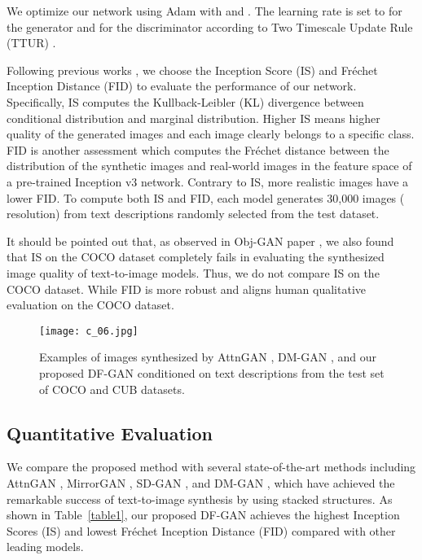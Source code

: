 \documentclass[10pt,twocolumn,letterpaper]{article}
\begin{document}
 We optimize our network using Adam \cite{kingma2014adam} with  and . The learning rate is set to  for the generator and  for the discriminator according to Two Timescale Update Rule (TTUR) \cite{heusel2017gans}. 

 Following previous works \cite{xu2018attngan, zhu2019dm}, we choose the Inception Score (IS) \cite{salimans2016improved} and Fr\'echet Inception Distance (FID) \cite{heusel2017gans} to evaluate the performance of our network. 
Specifically, IS computes the Kullback-Leibler (KL) divergence between conditional distribution and marginal distribution. 
Higher IS means higher quality of the generated images and each image clearly belongs to a specific class. 
FID \cite{heusel2017gans} is another assessment which computes the Fr\'echet distance between the distribution of the synthetic images and real-world images in the feature space of a pre-trained Inception v3 network. 
Contrary to IS, more realistic images have a lower FID.
To compute both IS and FID, each model generates 30,000 images ( resolution) from text descriptions randomly selected from the test dataset. 

It should be pointed out that, as observed in Obj-GAN paper \cite{li2019object,ramesh2021zero}, we also found that IS on the COCO dataset completely fails in evaluating the synthesized image quality of text-to-image models. Thus, we do not compare IS on the COCO dataset. While  FID is more robust and aligns human qualitative evaluation on the COCO dataset. 

\begin{figure*}[t] \small
  \centering
  \texttt{[image: c\_06.jpg]}
  \caption{Examples of images synthesized by AttnGAN \cite{xu2018attngan}, DM-GAN \cite{zhu2019dm}, and our proposed DF-GAN conditioned on text descriptions from the test set of COCO and CUB datasets.}
  \label{fig6}
  \vspace{-0.4cm}
\end{figure*}

\subsection{Quantitative Evaluation}
We compare the proposed method with several state-of-the-art methods including AttnGAN \cite{xu2018attngan}, MirrorGAN \cite{qiao2019mirrorgan}, SD-GAN \cite{yin2019semantics}, and DM-GAN \cite{zhu2019dm}, which have achieved the remarkable success of text-to-image synthesis by using stacked structures. 
As shown in Table~\ref{table1}, our proposed DF-GAN achieves the highest Inception Scores (IS) and lowest Fr\'echet Inception Distance (FID) compared with other leading models. 
\end{document}
